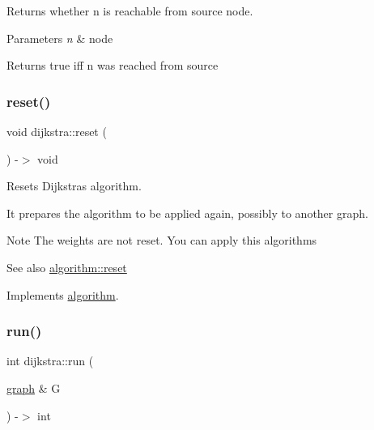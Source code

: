 Returns whether {\ttfamily n} is reachable from source node. 


\begin{DoxyParams}{Parameters}
{\em n} & node\\
\hline
\end{DoxyParams}
\begin{DoxyReturn}{Returns}
{\ttfamily true} iff {\ttfamily n} was reached from source 
\end{DoxyReturn}
\mbox{\label{classdijkstra_a1b767b039cb69c422c5cc3247246e951}} 
\subsubsection{\texorpdfstring{reset()}{reset()}}
{\footnotesize\ttfamily void dijkstra\+::reset (\begin{DoxyParamCaption}{ }\end{DoxyParamCaption}) -\/$>$ void\hspace{0.3cm}{\ttfamily [virtual]}}



Resets Dijkstra\textquotesingle{}s algorithm. 

It prepares the algorithm to be applied again, possibly to another graph.

\begin{DoxyNote}{Note}
The weights are not reset. You can apply this algorithms
\end{DoxyNote}
\begin{DoxySeeAlso}{See also}
\mbox{\hyperlink{classalgorithm_aea645f2e39976a477c8f8564656fd1b6}{algorithm\+::reset}} 
\end{DoxySeeAlso}


Implements \mbox{\hyperlink{classalgorithm_aea645f2e39976a477c8f8564656fd1b6}{algorithm}}.

\mbox{\label{classdijkstra_a4a001133b2d94fd7cd2012ff18b5139b}} 
\subsubsection{\texorpdfstring{run()}{run()}}
{\footnotesize\ttfamily int dijkstra\+::run (\begin{DoxyParamCaption}\item[{\mbox{\hyperlink{classgraph}{graph}} \&}]{G }\end{DoxyParamCaption}) -\/$>$ int\hspace{0.3cm}{\ttfamily [virtual]}}



